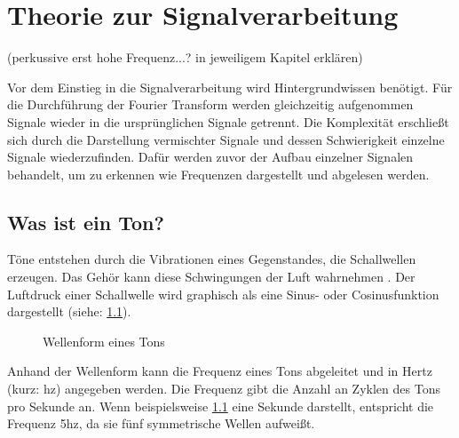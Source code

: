 \chapter{Theorie zur Signalverarbeitung}
\label{theorie}
%

(perkussive erst hohe Frequenz...? in jeweiligem  Kapitel erklären)

Vor dem Einstieg in die Signalverarbeitung wird Hintergrundwissen benötigt. Für die Durchführung der Fourier Transform werden gleichzeitig aufgenommen Signale wieder in die ursprünglichen Signale getrennt. Die Komplexität erschließt sich durch die Darstellung vermischter Signale und dessen Schwierigkeit einzelne Signale wiederzufinden. Dafür werden zuvor der Aufbau einzelner Signalen behandelt, um zu erkennen wie Frequenzen dargestellt und abgelesen werden. 

%
\section{Was ist ein Ton?}
\label{sounds}
%

Töne entstehen durch die Vibrationen eines Gegenstandes, die Schallwellen erzeugen. Das Gehör kann diese Schwingungen der Luft wahrnehmen \parencite{signaltoene}. Der Luftdruck einer Schallwelle wird graphisch als eine Sinus- oder Cosinusfunktion dargestellt (siehe: \cref{wav_sound}).

%
\begin{figure}[h]
    \centering
    \caption{Wellenform eines Tons}
    \label{wav_sound}
\end{figure}
%

Anhand der Wellenform kann die Frequenz eines Tons abgeleitet und in Hertz (kurz: hz) angegeben werden. Die Frequenz gibt die Anzahl an Zyklen des Tons pro Sekunde an. Wenn beispielsweise \cref{wav_sound} eine Sekunde darstellt, entspricht die Frequenz 5hz, da sie fünf symmetrische Wellen aufweißt.

\par

